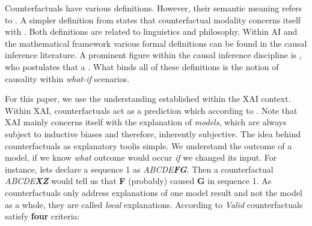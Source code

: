 \documentclass[./../../paper.tex]{subfiles}
\begin{document}
Counterfactuals have various definitions. However, their semantic meaning refers to \cite{_counterfactual_}. A simpler definition from \citeauthor{starr_Counterfactuals_2021} states that counterfactual modality concerns itself with .
Both definitions are related to linguistics and philosophy. Within AI and the mathematical framework various formal definitions can be found in the causal inference\cite{hitchcock_CausalModels_2020} literature. A prominent figure within the causal inference discipline is \citeauthor{pearl_Causalinferencestatistics_2016}, who postulates that a \cite{pearl_Causalinferencestatistics_2016}. What binds all of these definitions is the notion of causality within \emph{what-if} scenarios.

For this paper, we use the understanding established within the \gls{XAI} context. Within \gls{XAI}, counterfactuals act as a prediction which  according to \citeauthor{molnar2019}\cite[p. 212]{molnar2019}. Note that \gls{XAI} mainly concerns itself with the explanation of \emph{models}, which are always subject to inductive biases and therefore, inherently subjective. The idea behind counterfactuals as explanatory tool\footnotemark is simple. We understand the outcome of a model, if we know \emph{what} outcome would occur \emph{if} we changed its input. For instance, lets declare a sequence 1 as \textit{ABCDE\textbf{FG}}. Then a counterfactual \textit{ABCDE\textbf{XZ}} would tell us that \textbf{F} (probably) caused \textbf{G} in sequence 1. As counterfactuals only address explanations of one model result and not the model as a whole, they are called \emph{local} explanations\cite[p. 212]{molnar2019}. According to \citeauthor{molnar2019} \emph{Valid} counterfactuals satisfy \textbf{four} criteria\cite[p. 212]{molnar2019}:
\end{document}
